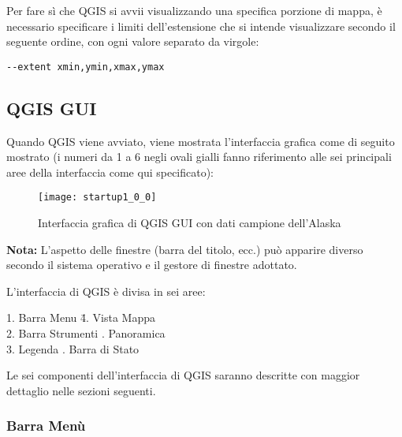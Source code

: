 Per fare sì che QGIS si avvii visualizzando una specifica porzione di mappa, è necessario
specificare i limiti dell'estensione che si intende visualizzare secondo il seguente ordine,
con ogni valore separato da virgole:

\begin{verbatim}
--extent xmin,ymin,xmax,ymax
\end{verbatim}


\subsection{QGIS GUI}
\label{label_qgismainwindow}

Quando QGIS viene avviato, viene mostrata l'interfaccia grafica come di seguito mostrato 
(i numeri da 1 a 6 negli ovali gialli fanno riferimento alle sei principali aree della
interfaccia come qui specificato):

\begin{figure}[ht]
   \begin{center}
   \caption{Interfaccia grafica di QGIS GUI con dati campione dell'Alaska \wincaption}
	 \label{fig:startup}
   \texttt{[image: startup1\_0\_0]}
\end{center} 
\end{figure}

\textbf{Nota:} L'aspetto delle finestre (barra del titolo, ecc.) può apparire diverso
secondo il sistema operativo e il gestore di finestre adottato.

L'interfaccia di QGIS è divisa in sei aree:

\begin{tabbing}
1. Barra Menu \hspace{3cm}\= 4. Vista Mappa \\
2. Barra Strumenti \hspace{3cm}. Panoramica  \\
3. Legenda \hspace{3cm}. Barra di Stato   
\end{tabbing}

Le sei componenti dell'interfaccia di QGIS saranno descritte con maggior dettaglio
nelle sezioni seguenti.

\subsubsection{Barra Menù}\label{label_menubar}

